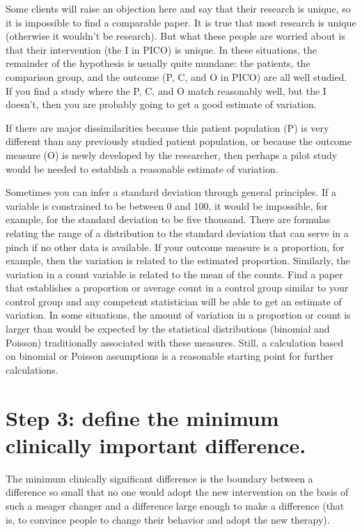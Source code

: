 \documentclass[
  letterpaper,
  DIV=11,
  numbers=noendperiod]{scrreprt}
\begin{document}
Some clients will raise an objection here and say that their research is
unique, so it is impossible to find a comparable paper. It is true that
most research is unique (otherwise it wouldn't be research). But what
these people are worried about is that their intervention (the I in
PICO) is unique. In these situations, the remainder of the hypothesis is
usually quite mundane: the patients, the comparison group, and the
outcome (P, C, and O in PICO) are all well studied. If you find a study
where the P, C, and O match reasonably well, but the I doesn't, then you
are probably going to get a good estimate of variation.

If there are major dissimilarities because this patient population (P)
is very different than any previously studied patient population, or
because the outcome measure (O) is newly developed by the researcher,
then perhaps a pilot study would be needed to establish a reasonable
estimate of variation.

Sometimes you can infer a standard deviation through general principles.
If a variable is constrained to be between 0 and 100, it would be
impossible, for example, for the standard deviation to be five thousand.
There are formulas relating the range of a distribution to the standard
deviation that can serve in a pinch if no other data is available. If
your outcome measure is a proportion, for example, then the variation is
related to the estimated proportion. Similarly, the variation in a count
variable is related to the mean of the counts. Find a paper that
establishes a proportion or average count in a control group similar to
your control group and any competent statistician will be able to get an
estimate of variation. In some situations, the amount of variation in a
proportion or count is larger than would be expected by the statistical
distributions (binomial and Poisson) traditionally associated with these
measures. Still, a calculation based on binomial or Poisson assumptions
is a reasonable starting point for further calculations.

\section{Step 3: define the minimum clinically important
difference.}\label{step-3-define-the-minimum-clinically-important-difference.}

The minimum clinically significant difference is the boundary between a
difference so small that no one would adopt the new intervention on the
basis of such a meager changer and a difference large enough to make a
difference (that is, to convince people to change their behavior and
adopt the new therapy).
\end{document}

